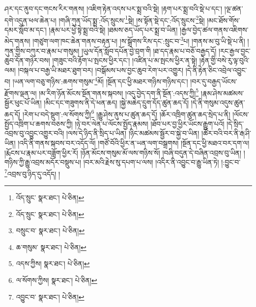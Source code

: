 ཤར་དང་ནུབ་དང་གངས་རིར་གནས། །འཇིག་རྟེན་འདས་པར་སྨྲ་བའི་སྡེ། །རྟག་པར་སྨྲ་བའི་སྡེ་པ་དང་། །ལྔ་ཚན་དགེ་འདུན་ཕལ་ཆེན་པ། །གཞི་ཀུན་ཡོད་སྨྲ་:འོད་སྲུངས་\footnote{འོད་སྲུང་  སྣར་ཐང་།  པེ་ཅིན། }སྡེ། །ས་སྟོན་སྡེ་དང་:འོད་སྲུངས་\footnote{འོད་སྲུང་  སྣར་ཐང་།  པེ་ཅིན། }སྡེ། །མང་ཐོས་གོས་དམར་སློབ་མ་དང་། །རྣམ་པར་ཕྱེ་སྟེ་སྨྲ་བའི་སྡེ། །ཐམས་ཅད་ཡོད་པར་སྨྲ་བ་ཡིན། །རྒྱལ་བྱེད་ཚལ་གནས་འཇིགས་མེད་གནས། །གཙུག་ལག་ཁང་ཆེན་གནས་བརྟན་པ། །ས་སྒྲོགས་རིས་དང་:སྲུང་བ་\footnote{བསྲུང་བ་  སྣར་ཐང་།  པེ་ཅིན། }པ། །གནས་མ་བུ་ཡི་སྡེ་པ་ནི། །ཀུན་གྱིས་བཀུར་བ་རྣམ་པ་གསུམ། །ཡུལ་དོན་སློབ་དཔོན་བྱེ་བྲག་གི །ཐ་དད་རྣམ་པ་བཅོ་བརྒྱད་དོ། །རང་རྒྱལ་བྱང་ཆུབ་དོན་གཉེར་བས། །གཟུང་བའི་རྟོག་པ་སྤངས་ཕྱིར་དང་། །འཛིན་པ་མ་སྤངས་ཕྱིར་ན་སྟེ། །རྟེན་གྱི་བསེ་རུ་ལྟ་བུའི་ལམ། །བསྐལ་པ་བརྒྱ་ཡི་མཐར་ཐུག་བར། །བསྒོམས་པས་བྱང་ཆུབ་རེག་པར་འགྱུར། །དེ་ནི་རྟེན་ཅིང་འབྲེལ་འབྱུང་བ། །ཡན་ལག་བཅུ་གཉིས་:ཆགས་གསུམ་\footnote{ཆ་གསུམ་  སྣར་ཐང་།  པེ་ཅིན། }མོ། །སྔོན་དང་ཕྱི་མཐར་གཉིས་གཉིས་དང་། །བར་དུ་བརྒྱད་ཡོངས་རྫོགས་ལྡན་ལ། །མ་རིག་ཉོན་མོངས་སྔོན་གནས་སྐབས། །འདུ་བྱེད་དག་ནི་སྔོན་:འདས་ཀྱི།\footnote{འདས་ཀྱིས།  སྣར་ཐང་།  པེ་ཅིན། } །རྣམ་ཤེས་མཚམས་སྦྱོར་ཕུང་པོ་ཡིན། །མིང་དང་གཟུགས་ནི་དེ་ཕན་ཆད། །སྐྱེ་མཆེད་དྲུག་དོད་ཚུན་ཆད་དོ། །དེ་ནི་གསུམ་འདུས་ཚུན་ཆད་དོ། །རེག་པ་བདེ་སྡུག་:ལ་སོགས་ཀྱི།\footnote{ལ་སོགས་ཀྱིས།  སྣར་ཐང་།  པེ་ཅིན། } །རྒྱུ་ཤེས་ནུས་པ་ཚུན་ཆད་དོ། །ཆོར་འཁྲིག་ཚུན་ཆད་སྲེད་པ་ནི། །ལོངས་སྤྱོད་འཁྲིག་པ་ཆགས་བཅས་ཀྱི། །ཉེ་བར་ལེན་པ་ལོངས་སྤྱོད་རྣམས། །ཐོབ་པར་བྱ་ཕྱིར་ཡོངས་རྒྱུག་པའོ། །དེ་སྲིད་འབྲས་བུ་འབྱུང་འགྱུར་བའི། །ལས་དེ་ཉིད་ནི་སྲིད་པ་ཡིན། །ཉིང་མཚམས་སྦྱོར་བ་སྐྱེ་བ་ཡིན། །ཚོར་བའི་བར་ནི་རྒ་ཤི་ཡིན། །འདི་ནི་གནས་སྐབས་བར་འདོད་ལོ། །གཙོ་བོའི་ཕྱིར་ན་ཡན་ལག་བསྒྲགས། །སྔོན་དང་ཕྱི་མཐའ་བར་དག་ལ། །རྨོངས་པ་རྣམ་པར་བཟློག་ཕྱིར་རོ། །ཉོན་མོངས་གསུམ་མོ་ལས་གཉིས་སོ། །བཞི་བདུན་དེ་བཞིན་འབྲས་བུ་ཡིན། །གཉིས་ཀྱི་རྒྱུ་འབྲས་མདོར་བསྡུས་པ། །བར་མའི་རྗེས་སུ་དཔག་པ་ལས། །འདིར་ནི་འབྱུང་བ་རྒྱུ་ཡིན་ཏེ། །:བྱུང་བ་\footnote{འབྱུང་བ་  སྣར་ཐང་།  པེ་ཅིན། }འབྲས་བུ་ཉིད་དུ་འདོད། །
